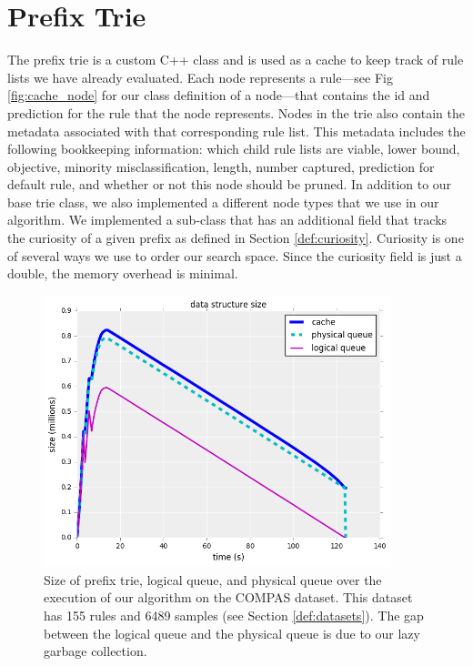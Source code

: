 \section{Prefix Trie}
The prefix trie is a custom C++ class and is used as a cache to keep track of rule lists we have already evaluated. 
Each node represents a rule---see Fig \ref{fig:cache_node} for our class definition of a node---that contains the id and prediction for the rule that the node represents.
Nodes in the trie also contain the metadata associated with that corresponding rule list. 
This metadata includes the following bookkeeping information: which child rule lists are viable, lower bound, objective, minority misclassification, length, number captured, prediction for default rule, and whether or not this node should be pruned.
In addition to our base trie class, we also implemented a different node types that we use in our algorithm.
We implemented a sub-class that has an additional field that tracks the curiosity of a given prefix as defined in Section \ref{def:curiosity}.
Curiosity is one of several ways we use to order our search space.
Since the curiosity field is just a double, the memory overhead is minimal.

\begin{figure}[t!]
\begin{center}
\includegraphics[width=0.9\textwidth]{figs/compas-queue-cache-size-insertions.png}
\end{center}
\caption{Size of prefix trie, logical queue, and physical queue over the execution of our algorithm on the COMPAS dataset.
This dataset has 155 rules and 6489 samples (see Section \ref{def:datasets}).
The gap between the logical queue and the physical queue is due to our lazy garbage collection.}
\label{fig:queue_gc}
\end{figure}

